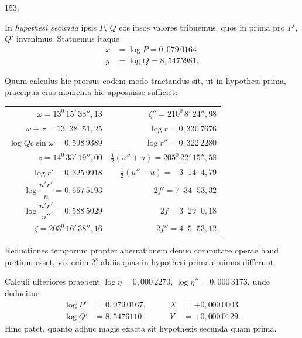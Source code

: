 \par{}\medskip
\hypertarget{native-207-article153}{}
\begin{center}153.\end{center}
In \textit{hypothesi secunda} ipsis $P$, $Q$ eos ipsos valores tribuemus, quos in prima pro $P'$, $Q'$ invenimus. Statuemus itaque
\[
\begin{aligned}
x&=\log P=0{,}079\,0164\\
y&=\log Q=8{,}5475981.
\end{aligned}
\]

Quum calculus hic prorsus eodem modo tractandus sit, ut in hypothesi prima, praecipua eius momenta hic apposuisse sufficiet:
\begin{center}
\small
\setlength{\tabcolsep}{6pt}
\begin{tabular}{@{}r|r@{}}
$\omega=13^0\,15'\,38''{,}13$ & $\zeta''=210^0\,8'\,24''{,}98$\\[.5em]
$\omega+\sigma=13\;\;38\;\;51{,}25$ & $\log r=0{,}330\,7676$\\[.5em]
$\log Qc\sin\omega=0{,}598\,9389$ & $\log r''=0{,}322\,2280$\\[.5em]
$z=14^0\,33'\,19''{,}00$ & $\tfrac12(u''+u)=205^0\,22'\,15''{,}58$\\[.5em]
$\log r'=0{,}325\,9918$ & $\tfrac12(u''-u)=-3\;\;14\;\;4{,}79$\\[.7em]
$\log\dfrac{n'r'}{n}=0{,}667\,5193$ & $2f'=7\;\;34\;\;53{,}32$\\[.7em]
$\log\dfrac{n'r'}{n''}=0{,}588\,5029$ & $2f=3\;\;29\;\;0{,}18$\\[.5em]
$\zeta=203^0\,16'\,38''{,}16$ & $2f''=4\;\;5\;\;53{,}12$
\end{tabular}
\end{center}

Reductiones temporum propter aberrationem denuo computare operae haud pretium esset, vix enim $2^{\mathrm{s}}$ ab iis quas in hypothesi prima eruimus differunt.

Calculi ulteriores praebent $\log\eta=0{,}000\,2270$, $\log\eta''=0{,}000\,3173$, unde deducitur
\[
\begin{aligned}
\log P'&=0{,}079\,0167,&\qquad X&=+0{,}000\,0003\\
\log Q'&=8{,}5476110,&\qquad Y&=+0{,}000\,0129.
\end{aligned}
\]
Hinc patet, quanto adhuc magis exacta sit hypothesis secunda quam prima.
